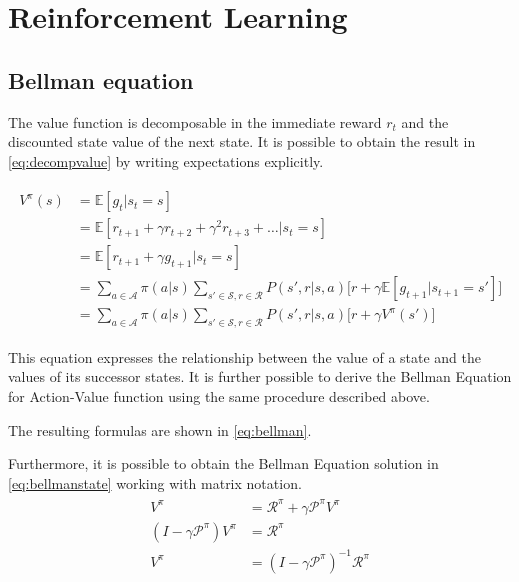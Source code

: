 \appendix

\chapter{Reinforcement Learning}

\section{Bellman equation} \label{appendix:bellmaneq}


The value function is decomposable in the immediate reward $r_t$ and the discounted state value of the next state. It is possible to obtain the result in \vref{eq:decompvalue} by writing expectations explicitly.

\begin{align}\label{eq:decompvalue}
\begin{split}
V^\pi(s) &= \mathbb{E}[g_t | s_t = s] \\
&= \mathbb{E}[r_{t+1} + \gamma r_{t+2} + \gamma^2 r_{t+3} + \dots | s_t = s] \\
&= \mathbb{E}[r_{t+1} + \gamma g_{t+1} | s_t = s] \\
&= \sum_{a \in \mathcal{A}}\pi(a|s)\sum_{s' \in \mathcal{S}, r \in \mathcal{R}}P(s', r | s, a)\big[r + \gamma\mathbb{E}[g_{t+1}| s_{t+1} = s']\big]\\
&= \sum_{a \in \mathcal{A}}\pi(a|s)\sum_{s' \in \mathcal{S}, r \in \mathcal{R}}P(s', r | s, a)\big[r + \gamma V^\pi(s')\big]
\end{split}
\end{align}

This equation expresses the relationship between the value of a state and the values of its successor states. It is further possible to derive the Bellman Equation for Action-Value function using the same procedure described above.

The resulting formulas are shown in \vref{eq:bellman}.

Furthermore, it is possible to obtain the Bellman Equation solution in \vref{eq:bellmanstate} working with matrix notation.
\begin{align} \label{eq:bellmanstate}
\begin{split}
V^\pi &= \mathcal{R}^\pi + \gamma \mathcal{P}^\pi V^\pi \\
(I - \gamma\mathcal{P}^\pi)V^\pi &= \mathcal{R}^\pi \\
V^\pi &= (I - \gamma\mathcal{P}^\pi)^{-1}\mathcal{R}^\pi
\end{split}
\end{align}
\newpage

